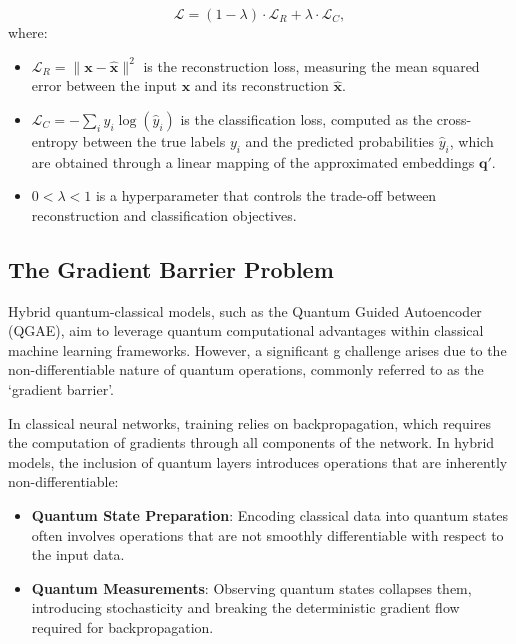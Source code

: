 \documentclass[conference]{IEEEtran}
\begin{document}
\begin{equation}
    \mathcal{L} = (1-\lambda) \cdot \mathcal{L}_R + \lambda \cdot \mathcal{L}_{C},
    \label{eq:composed_loss_function}
\end{equation}
where:
\begin{itemize}
    \item \( \mathcal{L}_R = \| \mathbf{x} - \hat{\mathbf{x}} \|^2 \) is the reconstruction loss, measuring the mean squared error between the input \( \mathbf{x} \) and its reconstruction \( \mathbf{\hat{x}} \).
    \item \( \mathcal{L}_C = -\sum_i y_i \log(\hat{y}_i) \) is the classification loss, computed as the cross-entropy between the true labels \( y_i \) and the predicted probabilities \( \hat{y}_i \), which are obtained through a linear mapping of the 
    approximated embeddings \(\mathbf{q}'\).
    \item \( 0 < \lambda < 1 \) is a hyperparameter that controls the trade-off between reconstruction and classification objectives.
\end{itemize}    
\subsection{The Gradient Barrier Problem}
Hybrid quantum-classical models, such as the Quantum Guided Autoencoder 
(QGAE), aim to leverage quantum computational advantages within 
classical machine learning frameworks. However, a significant g
challenge arises due to the non-differentiable nature of quantum 
operations, commonly referred to as the `gradient barrier'.

In classical neural networks, training relies on backpropagation, 
which requires the computation of gradients through all components 
of the network. In hybrid models, the inclusion of quantum 
layers introduces operations that are inherently non-differentiable:

\begin{itemize}
    \item \textbf{Quantum State Preparation}: 
    Encoding classical data into 
    quantum states often involves operations 
    that are not smoothly differentiable with 
    respect to the input data.
    
    \item \textbf{Quantum Measurements}:
    Observing quantum states collapses them, 
    introducing stochasticity and breaking the 
    deterministic gradient flow required 
    for backpropagation.
\end{itemize}
\end{document}
